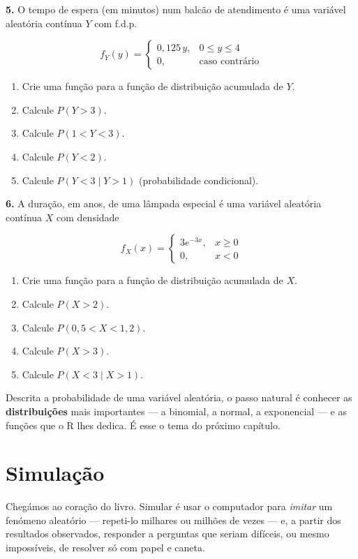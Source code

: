 \documentclass[
  portuguese,
  11pt,
  openany]{book}
\providecommand{\tightlist}{%
  \setlength{\itemsep}{0pt}\setlength{\parskip}{0pt}}
\begin{document}
\textbf{5.} O tempo de espera (em minutos) num balcão de atendimento é uma variável aleatória
contínua \(Y\) com f.d.p.

\[f_Y(y) = \begin{cases} 0{,}125\,y, & 0 \leq y \leq 4 \\ 0, & \text{caso contrário} \end{cases}\]

\begin{enumerate}
\def\labelenumi{(\alph{enumi})}
\tightlist
\item
  Crie uma função para a função de distribuição acumulada de \(Y\).
\item
  Calcule \(P(Y > 3)\).
\item
  Calcule \(P(1 < Y < 3)\).
\item
  Calcule \(P(Y < 2)\).
\item
  Calcule \(P(Y < 3 \mid Y > 1)\) (probabilidade condicional).
\end{enumerate}

\textbf{6.} A duração, em anos, de uma lâmpada especial é uma variável aleatória contínua \(X\)
com densidade

\[f_X(x) = \begin{cases} 3e^{-3x}, & x \geq 0 \\ 0, & x < 0 \end{cases}\]

\begin{enumerate}
\def\labelenumi{(\alph{enumi})}
\tightlist
\item
  Crie uma função para a função de distribuição acumulada de \(X\).
\item
  Calcule \(P(X > 2)\).
\item
  Calcule \(P(0{,}5 < X < 1{,}2)\).
\item
  Calcule \(P(X > 3)\).
\item
  Calcule \(P(X < 3 \mid X > 1)\).
\end{enumerate}

Descrita a probabilidade de uma variável aleatória, o passo natural é conhecer as
\textbf{distribuições} mais importantes --- a binomial, a normal, a exponencial --- e as funções
que o R lhes dedica. É esse o tema do próximo capítulo.

\chapter{Simulação}\label{simulacao}

Chegámos ao coração do livro. Simular é usar o computador para \emph{imitar} um fenómeno
aleatório --- repeti-lo milhares ou milhões de vezes --- e, a partir dos resultados
observados, responder a perguntas que seriam difíceis, ou mesmo impossíveis, de
resolver só com papel e caneta.
\end{document}
